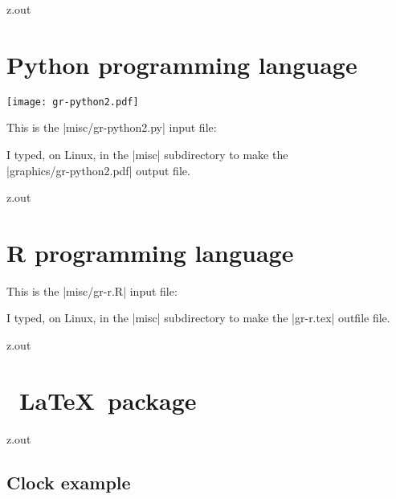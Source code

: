 \begin{VerbatimOut}{z.out}
\section{Python programming language}


\texttt{[image: gr-python2.pdf]}

This is the |misc/gr-python2.py| input file:

I typed, on Linux,
in the |misc| subdirectory
to make the\\
|graphics/gr-python2.pdf| output file.
\end{VerbatimOut}

\MyIO



\begin{VerbatimOut}{z.out}

\section{R programming language}




This is the |misc/gr-r.R| input file:

I typed, on Linux,
in the |misc| subdirectory to make the |gr-r.tex| outfile file.
\end{VerbatimOut}

\MyIO


\begin{VerbatimOut}{z.out}

\section{\TikZLogo\ \LaTeX\ package}

\end{VerbatimOut}

\MyIO


\begin{VerbatimOut}{z.out}

\subsection{Clock example}
\end{VerbatimOut}


